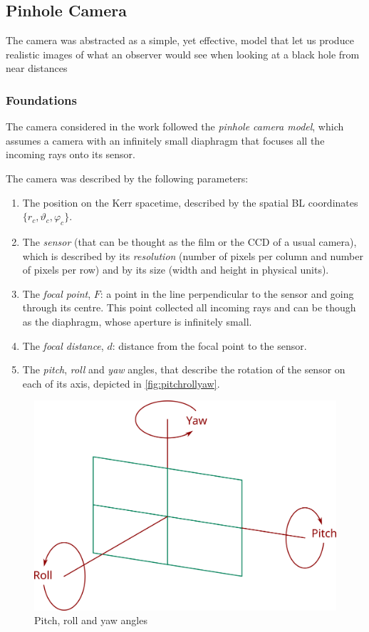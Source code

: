 \subsection{Pinhole Camera}
\label{sec:pinhole}

The camera was abstracted as a simple, yet effective, model that let us produce realistic images of what an observer would see when looking at a black hole from near distances 

\subsubsection*{Foundations}

The camera considered in the work followed the \emph{pinhole camera model}, which assumes a camera with an infinitely small diaphragm that focuses all the incoming rays onto its sensor.

The camera was described by the following parameters:
\begin{enumerate}
	\item The position on the Kerr spacetime, described by the spatial \ac{BL} coordinates $\{r_c, \vartheta_c, \varphi_c\}$.
	\item The \emph{sensor} (that can be thought as the film or the CCD of a usual camera), which is described by its \emph{resolution} (number of pixels per column and number of pixels per row) and by its size (width and height in physical units).
	\item The \emph{focal point}, $F$: a point in the line perpendicular to the sensor and going through its centre. This point collected all incoming rays and can be though as the diaphragm, whose aperture is infinitely small.
	\item The \emph{focal distance}, $d$: distance from the focal point to the sensor.
	\item The \emph{pitch}, \emph{roll} and \emph{yaw} angles, that describe the rotation of the sensor on each of its axis, depicted in \autoref{fig:pitchrollyaw}.
\end{enumerate}

\begin{figure}[bth]
	\myfloatalign
	\includegraphics[width=.5\linewidth]{gfx/rollpitchyaw.png}
	\caption[Pitch, roll and yaw angles]{Pitch, roll and yaw angles}
	\label{fig:pitchrollyaw}
\end{figure}

